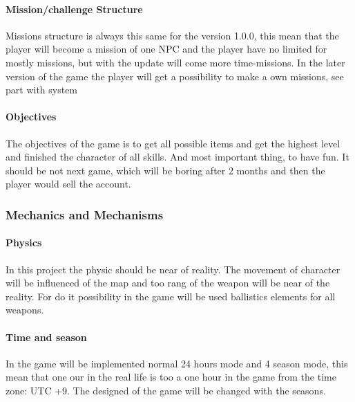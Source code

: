 \documentclass[parskip=full]{scrartcl}
\begin{document}
					\paragraph{Mission/challenge Structure} \vspace{-5mm}
						\par \begingroup
						\leftskip=2cm
						\noindent
								Missions structure is always this same for the version 1.0.0, this mean that the player will become a mission of one NPC and the player have no limited for mostly missions, but with the update will come more time-missions. In the later version of the game  the player will get a possibility to make a own missions, see part with system
						\par \endgroup
					\paragraph{Objectives} \vspace{-5mm}
						\par \begingroup
						\leftskip=2cm
						\noindent
								The objectives of the game is to get all possible items and get the highest level and finished the character of all skills. And most important thing, to have fun. It should be not next game, which will be boring after 2 months and then the player would sell the account.
						\par \endgroup
				\subsubsection{Mechanics and Mechanisms} \vspace{-5mm}
					\paragraph{Physics} \vspace{-5mm}
						\par \begingroup
						\leftskip=2cm
						\noindent
								In this project the physic should be near of reality. The movement of character will be influenced of the map and too rang of the weapon will be near of the reality. For do it possibility in the game will be used ballistics elements for all weapons. 
						\par \endgroup
					\paragraph{Time and season} \vspace{-5mm}
						\par \begingroup
						\leftskip=2cm
						\noindent
								In the game will be implemented normal 24 hours mode and 4 season mode, this mean that one our in the real life is too a one hour in the game from the time zone: UTC +9. The designed of the game will be changed with the seasons.
						\par \endgroup
\end{document}
